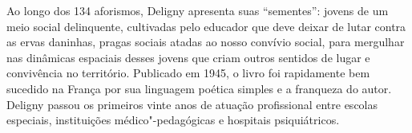 Ao longo dos 134 aforismos, Deligny apresenta suas “sementes”: jovens de um meio social delinquente, cultivadas pelo educador que deve deixar de lutar contra as ervas daninhas, pragas sociais atadas ao nosso convívio social, para mergulhar nas dinâmicas espaciais desses jovens que criam outros sentidos de lugar e convivência no território. Publicado em 1945, o livro foi rapidamente bem sucedido na França por sua linguagem poética simples e a franqueza do autor. Deligny passou os primeiros vinte anos de atuação profissional entre escolas especiais, instituições médico"-pedagógicas e hospitais psiquiátricos.

\vfill

\hspace*{-.4cm}\begin{minipage}[c]{1\linewidth}
\small{
{}}
\end{minipage}


\pagebreak
\pagestyle{n-1cat}

